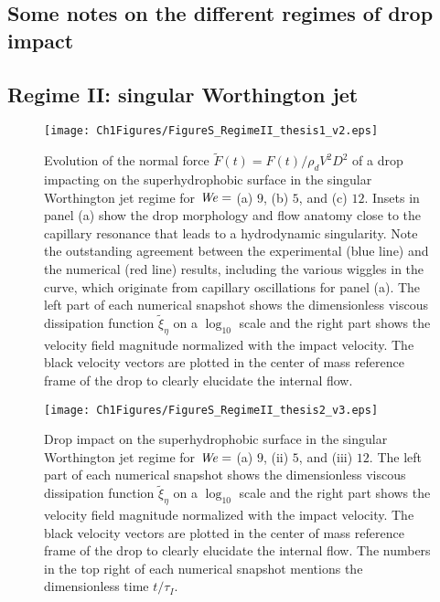 \begin{subappendices}
	\section{Some notes on the different regimes of drop impact}
	\label{Ch2:SecNotes}
	
	\subsection{Regime II: singular Worthington jet}
	
	\begin{figure}
		\centering
		\texttt{[image: Ch1Figures/FigureS\_RegimeII\_thesis1\_v2.eps]}
		\caption{Evolution of the normal force $\tilde{F}(t) = F(t)/\rho_dV^2D^2$ of a drop impacting on the superhydrophobic surface in the singular Worthington jet regime for $\mathit{We} =$ (a) $9$, (b) $5$, and (c) $12$. Insets in panel (a) show the drop morphology and flow anatomy close to the capillary resonance that leads to a hydrodynamic singularity. Note the outstanding agreement between the experimental (blue line) and the numerical (red line) results, including the various wiggles in the curve, which originate from capillary oscillations for panel (a). The left part of each numerical snapshot shows the dimensionless viscous dissipation function $\tilde{\xi}_\eta$ on a $\log_{10}$ scale and the right part shows the velocity field magnitude normalized with the impact velocity. The black velocity vectors are plotted in the center of mass reference frame of the drop to clearly elucidate the internal flow.}
		\label{Ch2:Fig_RegimeII}
	\end{figure}

	\begin{figure}
		\centering
		\texttt{[image: Ch1Figures/FigureS\_RegimeII\_thesis2\_v3.eps]}
		\caption{Drop impact on the superhydrophobic surface in the singular Worthington jet regime for $\mathit{We} =$ (a) $9$, (ii) $5$, and (iii) $12$. The left part of each numerical snapshot shows the dimensionless viscous dissipation function $\tilde{\xi}_\eta$ on a $\log_{10}$ scale and the right part shows the velocity field magnitude normalized with the impact velocity. The black velocity vectors are plotted in the center of mass reference frame of the drop to clearly elucidate the internal flow. The numbers in the top right of each numerical snapshot mentions the dimensionless time $t/\tau_I$.}
		\label{Ch2:Fig_RegimeII_2}
	\end{figure}
	

\end{subappendices}
